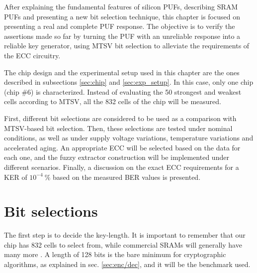\label{chap:5}
After explaining the fundamental features of silicon PUFs, describing SRAM PUFs and presenting a new bit selection technique, this chapter is focused on presenting a real and complete PUF response. The objective is to verify the assertions made so far by turning the PUF with an unreliable response into a reliable key generator, using MTSV bit selection to alleviate the requirements of the ECC circuitry.

The chip design and the experimental setup used in this chapter are the ones described in subsections \ref{sec:chip} and \ref{sec:exp_setup}. In this case, only one chip (chip \#6) is characterized. Instead of evaluating the 50 strongest and weakest cells according to MTSV, all the 832 cells of the chip will be measured. 

First, different bit selections are considered to be used as a comparison with MTSV-based bit selection. Then, these selections are tested under nominal conditions, as well as under supply voltage variations, temperature variations and accelerated aging. An appropriate ECC will be selected based on the data for each one, and the fuzzy extractor construction will be implemented under different scenarios. Finally, a discussion on the exact ECC requirements for a KER of $10^{-4} \ \%$ based on the measured BER values is presented.





\section{Bit selections}

The first step is to decide the key-length. It is important to remember that our chip has 832 cells to select from, while commercial SRAMs will generally have many more \cite{Schrijen2012}. A length of 128 bits is the bare minimum for cryptographic algorithms, as explained in sec. \ref{sec:enc/dec}, and it will be the benchmark used. 

